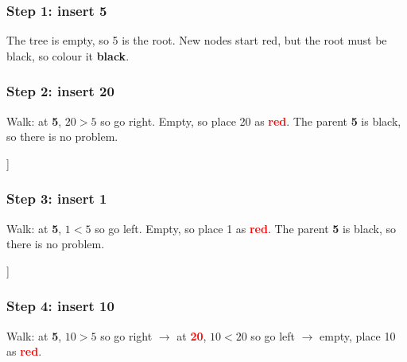 \documentclass[11pt]{article}
\newcommand{\rd}[1]{\textcolor{Red}{\textbf{#1}}}   %
\newcommand{\bk}[1]{\textbf{#1}}                    %
\begin{document}
	\subsubsection*{Step 1: insert 5}
	The tree is empty, so 5 is the root. New nodes start red, but the root must be black, so colour it \bk{black}.
	\begin{center}
		\begin{forest}
			[5, blackn]
		\end{forest}
	\end{center}
	
	\subsubsection*{Step 2: insert 20}
	Walk: at \bk{5}, $20>5$ so go right. Empty, so place 20 as \rd{red}. The parent \bk{5} is black, so there is no problem.
	\begin{center}
		\begin{forest}
			[5, blackn
			[,phantom]
			[20, redn, onpath]
			]
		\end{forest}
	\end{center}
	
	\subsubsection*{Step 3: insert 1}
	Walk: at \bk{5}, $1<5$ so go left. Empty, so place 1 as \rd{red}. The parent \bk{5} is black, so there is no problem.
	\begin{center}
		\begin{forest}
			[5, blackn
			[1, redn, onpath]
			[20, redn]
			]
		\end{forest}
	\end{center}
	
	\subsubsection*{Step 4: insert 10}
	Walk: at \bk{5}, $10>5$ so go right $\to$ at \rd{20}, $10<20$ so go left $\to$ empty, place 10 as \rd{red}.
	
\end{document}
